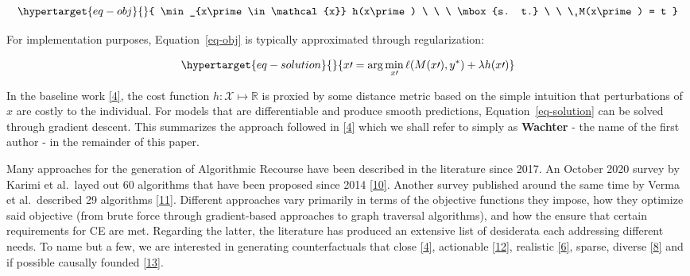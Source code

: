 \documentclass[
  conference]{IEEEtran}
\begin{document}
\begin{equation}\protect\hypertarget{eq-obj}{}{
\min_{x\prime \in \mathcal{x}} h(x\prime) \ \ \ \mbox{s. t.} \ \ \ M(x\prime) = t
}\label{eq-obj}\end{equation}

For implementation purposes, Equation~\ref{eq-obj} is typically
approximated through regularization:

\begin{equation}\protect\hypertarget{eq-solution}{}{
x\prime = \arg \min_{x\prime}  \ell(M(x\prime),y^*) + \lambda h(x\prime)
}\label{eq-solution}\end{equation}

In the baseline work
\protect\hyperlink{ref-wachter2017counterfactual}{{[}4{]}}, the cost
function \(h: \mathcal{X} \mapsto \mathbb{R}\) is proxied by some
distance metric based on the simple intuition that perturbations of
\(x\) are costly to the individual. For models that are differentiable
and produce smooth predictions, Equation~\ref{eq-solution} can be solved
through gradient descent. This summarizes the approach followed in
\protect\hyperlink{ref-wachter2017counterfactual}{{[}4{]}} which we
shall refer to simply as \textbf{Wachter} - the name of the first author
- in the remainder of this paper.

Many approaches for the generation of Algorithmic Recourse have been
described in the literature since 2017. An October 2020 survey by Karimi
et al.~layed out 60 algorithms that have been proposed since 2014
\protect\hyperlink{ref-karimi2020survey}{{[}10{]}}. Another survey
published around the same time by Verma et al.~described 29 algorithms
\protect\hyperlink{ref-verma2020counterfactual}{{[}11{]}}. Different
approaches vary primarily in terms of the objective functions they
impose, how they optimize said objective (from brute force through
gradient-based approaches to graph traversal algorithms), and how the
ensure that certain requirements for CE are met. Regarding the latter,
the literature has produced an extensive list of desiderata each
addressing different needs. To name but a few, we are interested in
generating counterfactuals that close
\protect\hyperlink{ref-wachter2017counterfactual}{{[}4{]}}, actionable
\protect\hyperlink{ref-ustun2019actionable}{{[}12{]}}, realistic
\protect\hyperlink{ref-schut2021generating}{{[}6{]}}, sparse, diverse
\protect\hyperlink{ref-mothilal2020explaining}{{[}8{]}} and if possible
causally founded
\protect\hyperlink{ref-karimi2021algorithmic}{{[}13{]}}.
\end{document}
